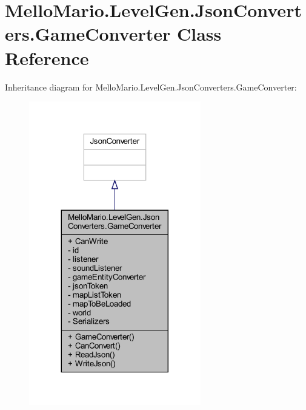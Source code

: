 \section{Mello\+Mario.\+Level\+Gen.\+Json\+Converters.\+Game\+Converter Class Reference}
\label{classMelloMario_1_1LevelGen_1_1JsonConverters_1_1GameConverter}


Inheritance diagram for Mello\+Mario.\+Level\+Gen.\+Json\+Converters.\+Game\+Converter\+:
\nopagebreak
\begin{figure}[H]
\begin{center}
\leavevmode
\includegraphics[width=212pt]{classMelloMario_1_1LevelGen_1_1JsonConverters_1_1GameConverter__inherit__graph}
\end{center}
\end{figure}


